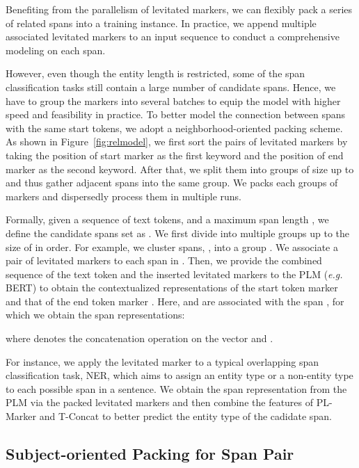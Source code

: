 \documentclass[11pt]{article}
\newcommand\Ourmodel{PL-Marker\xspace}
\begin{document}
Benefiting from the parallelism of levitated markers, we can flexibly pack a series of related spans into a training instance.  In practice, we append multiple associated levitated markers to an input sequence to conduct a comprehensive modeling on each span.  

However, even though the entity length is restricted, some of the span classification tasks still contain a large number of candidate spans. Hence, we have to group the markers into several batches to equip the model with higher speed and feasibility in practice.  To better model the connection between  spans with the same start tokens, we adopt a neighborhood-oriented packing scheme.  As shown in Figure~\ref{fig:relmodel}, we first sort the pairs of levitated markers by taking the position of start marker as the first keyword and the position of end marker as the second keyword. After that, we split them into groups of size up to  and thus gather adjacent spans into the same group. We packs each groups of markers and dispersedly process them in multiple runs. 


Formally, given a sequence of   text tokens,  and a maximum span length , we define the candidate spans set as .  
We first divide  into multiple groups up to the size of  in order. For example, we cluster  spans, , into a group . 
We associate a pair of levitated markers to each span in .  Then, we provide the combined sequence of the text token and  the inserted levitated markers to the PLM (\emph{e.g.} BERT) to obtain the contextualized representations of the start token marker  and that of the end token marker . Here,   and  are associated with the span , for which we obtain the span representations:

where  denotes the concatenation operation on the vector  and . 


For instance, we apply the levitated marker to a typical overlapping span classification task, NER, which aims to assign an entity type or a non-entity type to each possible span in a sentence. We obtain the span representation from the PLM via the packed levitated markers and then combine the features of \Ourmodel and T-Concat  to better predict the entity type of the cadidate span.






\subsection{Subject-oriented Packing for Span Pair}
\end{document}
